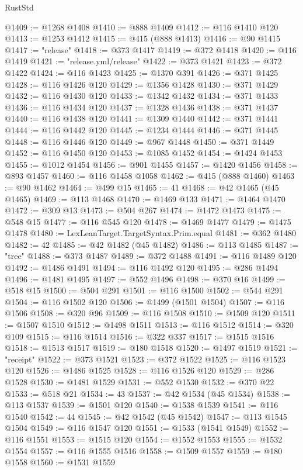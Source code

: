 \begin{lexlean}{RustStd}
\begin{coremodule}
@1409 := @1268 @1408
@1410 := @888 @1409
@1412 := @116 @1410 @120
@1413 := @1253 @1412
@1415 := @415 (@888 @1413)
@1416 := @90 @1415
@1417 := "release"
@1418 := @373 @1417
@1419 := @372 @1418
@1420 := @116 @1419
@1421 := "release.yml/release"
@1422 := @373 @1421
@1423 := @372 @1422
@1424 := @116 @1423
@1425 := @1370 @391
@1426 := @371 @1425
@1428 := @116 @1426 @120
@1429 := @1356 @1428
@1430 := @371 @1429
@1432 := @116 @1430 @120
@1433 := @1342 @1432
@1434 := @371 @1433
@1436 := @116 @1434 @120
@1437 := @1328 @1436
@1438 := @371 @1437
@1440 := @116 @1438 @120
@1441 := @1309 @1440
@1442 := @371 @1441
@1444 := @116 @1442 @120
@1445 := @1234 @1444
@1446 := @371 @1445
@1448 := @116 @1446 @120
@1449 := @967 @1448
@1450 := @371 @1449
@1452 := @116 @1450 @120
@1453 := @1085 @1452
@1454 := @1424 @1453
@1455 := @1012 @1454
@1456 := @901 @1455
@1457 := @1420 @1456
@1458 := @893 @1457
@1460 := @116 @1458 @1058
@1462 := @415 (@888 @1460)
@1463 := @90 @1462
@1464 := @499 @15
@1465 := 41
@1468 := @42 @1465 (@45 @1465)
@1469 := @113 @1468
@1470 := @1469 @133
@1471 := @1464 @1470
@1472 := @309 @13
@1473 := @504 @267
@1474 := @1472 @1473
@1475 := @548 @15
@1477 := @116 @545 @120
@1478 := @1469 @1477
@1479 := @1475 @1478
@1480 := LexLeanTarget.TargetSyntax.Prim.equal
@1481 := @362 @1480
@1482 := 42
@1485 := @42 @1482 (@45 @1482)
@1486 := @113 @1485
@1487 := "tree"
@1488 := @373 @1487
@1489 := @372 @1488
@1491 := @116 @1489 @120
@1492 := @1486 @1491
@1494 := @116 @1492 @120
@1495 := @286 @1494
@1496 := @1481 @1495
@1497 := @552 @1496
@1498 := @370 @16
@1499 := @518 @15
@1500 := @504 @291
@1501 := @116 @1500
@1502 := @544 @291
@1504 := @116 @1502 @120
@1506 := @1499 (@1501 @1504)
@1507 := @116 @1506
@1508 := @320 @96
@1509 := @116 @1508
@1510 := @1509 @120
@1511 := @1507 @1510
@1512 := @1498 @1511
@1513 := @116 @1512
@1514 := @320 @109
@1515 := @116 @1514
@1516 := @322 @337
@1517 := @1515 @1516
@1518 := @1513 @1517
@1519 := @180 @1518
@1520 := @1497 @1519
@1521 := "receipt"
@1522 := @373 @1521
@1523 := @372 @1522
@1525 := @116 @1523 @120
@1526 := @1486 @1525
@1528 := @116 @1526 @120
@1529 := @286 @1528
@1530 := @1481 @1529
@1531 := @552 @1530
@1532 := @370 @22
@1533 := @518 @21
@1534 := 43
@1537 := @42 @1534 (@45 @1534)
@1538 := @113 @1537
@1539 := @1501 @120
@1540 := @1538 @1539
@1541 := @116 @1540
@1542 := 44
@1545 := @42 @1542 (@45 @1542)
@1547 := @113 @1545 @1504
@1549 := @116 @1547 @120
@1551 := @1533 (@1541 @1549)
@1552 := @116 @1551
@1553 := @1515 @120
@1554 := @1552 @1553
@1555 := @1532 @1554
@1557 := @116 @1555 @1516
@1558 := @1509 @1557
@1559 := @180 @1558
@1560 := @1531 @1559

\end{coremodule}
\end{lexlean}
